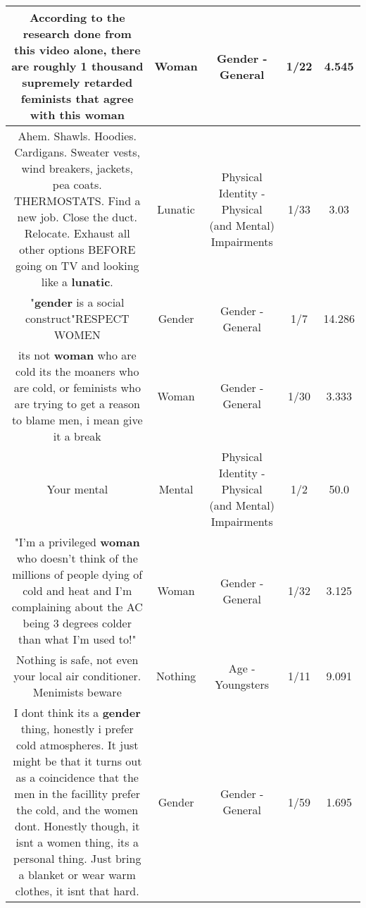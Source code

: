 \documentclass[11pt]{article}
\newlength\mylength
\begin{document}
\begin{center}
\begin{longtable}{|C{.65\mylength}|C{.30\mylength}|C{.12\mylength}|C{.12\mylength}|C{.12\mylength}|}
  \small According to the research done from this video alone, there are roughly 1 thousand supremely retarded feminists that agree with this woman\normalsize   & Woman & Gender - General & 1/22 & 4.545 \\  \hline
  \small Ahem. Shawls. Hoodies. Cardigans. Sweater vests, wind breakers, jackets, pea coats. THERMOSTATS. Find a new job. Close the duct. Relocate. Exhaust all other options BEFORE going on TV and looking like a \textbf{lunatic}.\normalsize   & Lunatic & Physical Identity - Physical (and Mental) Impairments & 1/33 & 3.03 \\  \hline
  \small "\textbf{gender} is a social construct"RESPECT WOMEN\normalsize   & Gender & Gender - General & 1/7 & 14.286 \\  \hline
  \small its not \textbf{woman} who are cold its the moaners who are cold, or feminists who are trying to get a reason to blame men, i mean give it a break\normalsize   & Woman & Gender - General & 1/30 & 3.333 \\  \hline
  \small Your mental\normalsize   & Mental & Physical Identity - Physical (and Mental) Impairments & 1/2 & 50.0 \\  \hline
  \small "I'm a privileged \textbf{woman} who doesn't think of the millions of people dying of cold and heat and I'm complaining about the AC being 3 degrees colder than what I'm used to!"\normalsize   & Woman & Gender - General & 1/32 & 3.125 \\  \hline
  \small Nothing is safe, not even your local air conditioner. Menimists beware\normalsize   & Nothing & Age - Youngsters & 1/11 & 9.091 \\  \hline
  \small I dont think its a \textbf{gender} thing, honestly i prefer cold atmospheres. It just might be that it turns out as a coincidence that the men in the facillity prefer the cold, and the women dont. Honestly though, it isnt a women thing, its a personal thing. Just bring a blanket or wear warm clothes, it isnt that hard.\normalsize   & Gender & Gender - General & 1/59 & 1.695 \\  \hline

\end{longtable}
\end{center}
\end{document}
